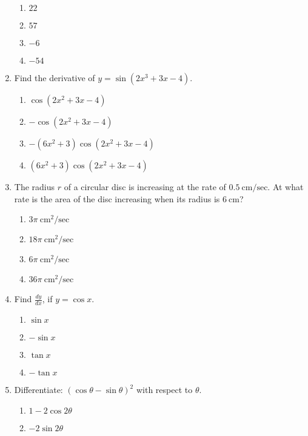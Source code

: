 \begin{enumerate}[label={\arabic*.}]
         \begin{enumerate}[label={\Alph*.}]
            \item  \(22\)
            \item \(57\)
            \item \(-6\)
            \item \(-54\)
        \end{enumerate}
  \item Find the derivative of \(y = \sin(2x^3+3x-4)\).
      \begin{enumerate}[label={\Alph*.}]
            \item \(\cos(2x^2+3x-4)\)
            \item \(-\cos(2x^2+3x-4)\)
            \item  \(-(6x^2+3)\cos(2x^2+3x-4)\)
            \item \((6x^2 + 3) \cos(2x^2+3x-4)\)
        \end{enumerate}
  \item The radius \(r\) of a circular disc is increasing at the rate of \(0.5\ \text{cm/sec}\). At what rate is the area of the disc increasing when its radius is \(6\ \text{cm}\)?
       \begin{enumerate}[label={\Alph*.}]
            \item  \(3\pi\ \text{cm}^2/\text{sec}\)
            \item  \(18\pi\ \text{cm}^2/\text{sec}\)
            \item  \(6\pi\ \text{cm}^2/\text{sec}\)
            \item \(36\pi\ \text{cm}^2/\text{sec}\)
        \end{enumerate}
  \item Find \( \frac{dy}{dx} \), if \(y = \cos x\).
       \begin{enumerate}[label={\Alph*.}]
            \item  \(\sin x\)
            \item  \(-\sin x\)
            \item  \(\tan x\)
            \item  \(-\tan x\)
        \end{enumerate}
  \item Differentiate: \((\cos \theta - \sin \theta)^2\) with respect to \(\theta\).
     \begin{enumerate}[label={\Alph*.}]
            \item \(1-2\cos 2\theta\)
            \item  \(-2\sin 2\theta\)

\end{enumerate}
\end{enumerate}
